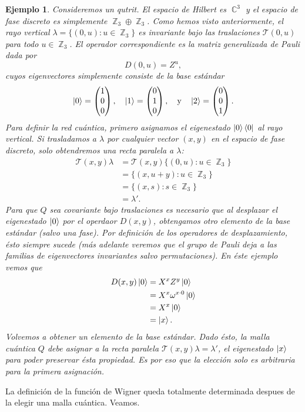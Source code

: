 \documentclass[a4paper,11pt]{report}
\DeclareMathOperator{\C}{\mathbb{C}}
\DeclareMathOperator{\Z}{\mathbb{Z}}
\newtheorem{example}{Ejemplo}
\begin{document}
  \begin{example}
    Consideremos un qutrit. El espacio de Hilbert es
    $\C^{3}$ y el espacio de fase discreto es simplemente
    $\Z_3 \oplus \Z_3$. Como hemos visto anteriormente, el
    rayo vertical $\lambda = \{(0,u) : u \in \Z_3\}$ es
    invariante bajo las traslaciones $\mathcal T(0,u)$ para
    todo $u \in \Z_3$. El operador correspondiente es la
    matriz generalizada de Pauli dada por
    \[
      D(0,u) = Z^{u},
    \] 
    cuyos eigenvectores simplemente consiste de la base
    estándar
    \[
      \ket 0 = \begin{pmatrix} 1\\0\\0 \end{pmatrix},
      \quad
      \ket 1 = \begin{pmatrix} 0\\1\\0 \end{pmatrix},
      \quad \text{y} \quad
      \ket 2 = \begin{pmatrix} 0\\0\\1 \end{pmatrix}.
    \] 
    Para definir la red cuántica, primero asignamos el
    eigenestado $\ket 0 \bra 0$ al rayo vertical. Si
    trasladamos a $\lambda$ por \textit{cualquier} vector
    $(x,y)$ en el espacio de fase discreto, solo obtendremos
    una recta paralela a $\lambda$:
    \begin{align}
      \mathcal T(x,y) \lambda
      &= \mathcal T(x,y) \{(0,u) : u \in \Z_3\} \\
      &= \{(x,u+y) : u \in \Z_3\} \\
      &= \{(x,s) : s \in \Z_3\} \\
      &= \lambda'.
    \end{align}
    Para que $Q$ sea covariante bajo traslaciones es
    necesario que al desplazar el eigenestado $\ket 0$ por
    el operdaor $D(x,y)$, obtengamos otro elemento de la
    base estándar (salvo una fase). Por definición de los
    operadores de desplazamiento, ésto siempre sucede (más
    adelante veremos que el grupo de Pauli deja a las
    familias de eigenvectores invariantes salvo
    permutaciones). En éste ejemplo vemos que
    \begin{align}
      D(x,y) \ket 0
      &= X^{x} Z^{y} \ket 0 \\
      &= X^{x} \omega^{x \cdot 0} \ket 0 \\
      &= X^{x} \ket 0 \\
      &= \ket x.
    \end{align}
    Volvemos a obtener un elemento de la base estándar. Dado
    ésto, la malla cuántica $Q$ debe asignar a la recta
    paralela $\mathcal T(x,y) \lambda = \lambda'$, el
    eigenestado $\ket x$ para poder preservar ésta
    propiedad. Es por eso que la elección solo es arbitraria
    para la primera asignación.
  \end{example}
  La definición de la función de Wigner queda totalmente
  determinada despues de la elegir una malla cuántica.
  Veamos.
\end{document}
